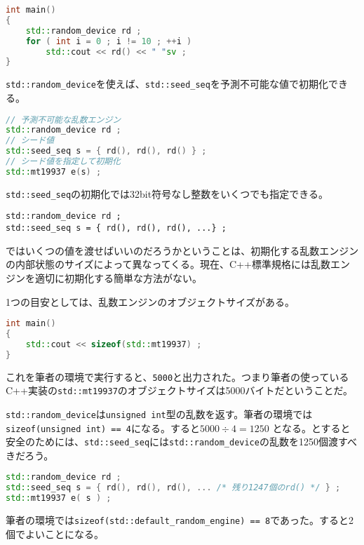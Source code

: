 \begin{lstlisting}[language={C++}]
int main()
{
    std::random_device rd ;
    for ( int i = 0 ; i != 10 ; ++i )
        std::cout << rd() << " "sv ;
}
\end{lstlisting}

\texttt{std::random\_device}を使えば、\texttt{std::seed\_seq}を予測不可能な値で初期化できる。

\begin{lstlisting}[language={C++}]
// 予測不可能な乱数エンジン
std::random_device rd ;
// シード値
std::seed_seq s = { rd(), rd(), rd() } ;
// シード値を指定して初期化
std::mt19937 e(s) ;
\end{lstlisting}

\clearpage
{}

\texttt{std::seed\_seq}の初期化では32bit符号なし整数をいくつでも指定できる。

\begin{lstlisting}[style=grammar]
std::random_device rd ;
std::seed_seq s = { rd(), rd(), rd(), ...} ;
\end{lstlisting}

ではいくつの値を渡せばいいのだろうかということは、初期化する乱数エンジンの内部状態のサイズによって異なってくる。現在、C++標準規格には乱数エンジンを適切に初期化する簡単な方法がない。

1つの目安としては、乱数エンジンのオブジェクトサイズがある。

\begin{lstlisting}[language={C++}]
int main()
{
    std::cout << sizeof(std::mt19937) ;   
}
\end{lstlisting}

これを筆者の環境で実行すると、\texttt{5000}と出力された。つまり筆者の使っているC++実装の\texttt{std::mt19937}のオブジェクトサイズは5000バイトだということだ。

\texttt{std::random\_device}は\texttt{unsigned int}型の乱数を返す。筆者の環境では\texttt{sizeof(unsigned int) == 4}になる。すると\(5000 \div 4 = 1250\) となる。とすると安全のためには、\texttt{std::seed\_seq}には\texttt{std::random\_device}の乱数を1250個渡すべきだろう。

\begin{lstlisting}[language={C++}]
std::random_device rd ;
std::seed_seq s = { rd(), rd(), rd(), ... /* 残り1247個のrd() */ } ;
std::mt19937 e( s ) ;
\end{lstlisting}

筆者の環境では\texttt{sizeof(std::default\_random\_engine) == 8}であった。すると2個でよいことになる。

